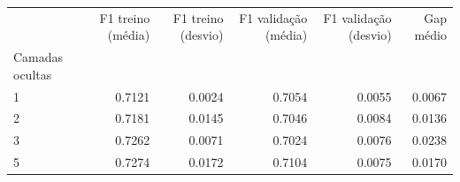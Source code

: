 \begin{tabular}{lrrrrr}
\toprule
 & F1 treino (média) & F1 treino (desvio) & F1 validação (média) & F1 validação (desvio) & Gap médio \\
Camadas ocultas &  &  &  &  &  \\
\midrule
1 & 0.7121 & 0.0024 & 0.7054 & 0.0055 & 0.0067 \\
2 & 0.7181 & 0.0145 & 0.7046 & 0.0084 & 0.0136 \\
3 & 0.7262 & 0.0071 & 0.7024 & 0.0076 & 0.0238 \\
5 & 0.7274 & 0.0172 & 0.7104 & 0.0075 & 0.0170 \\
\bottomrule
\end{tabular}
